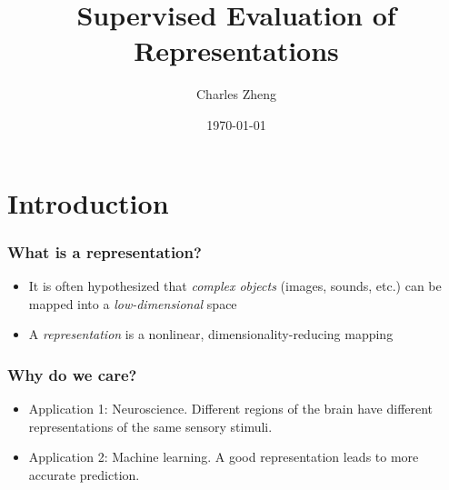 \documentclass{beamer}
\title[Defense]{Supervised Evaluation of Representations}
\author{Charles Zheng} %
\institute[Stanford] %
{Stanford University}
\date{\today} %
\begin{document}
\begin{frame}
\titlepage %
\end{frame}

\section{Introduction}


\begin{frame}
\frametitle{What is a representation?}
\begin{itemize}
\item It is often hypothesized that \emph{complex objects} (images, sounds, etc.) can be mapped into a \emph{low-dimensional} space
\item A \emph{representation} is a nonlinear, dimensionality-reducing mapping
\end{itemize}
\end{frame}

\begin{frame}
\frametitle{Why do we care?}
\begin{itemize}
\item Application 1: Neuroscience.  Different regions of the brain have different representations of the same sensory stimuli.
\item Application 2: Machine learning.  A good representation leads to more accurate prediction.
\end{itemize}
\end{frame}
\end{document}
